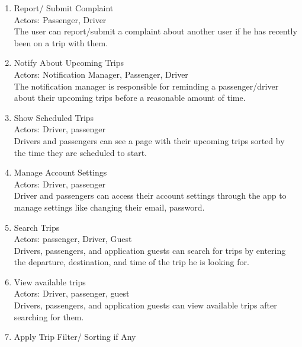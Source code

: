 \documentclass[a4paper, 12pt]{report} %
\begin{document}
\begin{enumerate}
                \item Report/ Submit Complaint \\
                    Actors: Passenger, Driver \\
                    The user can report/submit a complaint about another user if he has recently been on a trip with them.
                \item Notify About Upcoming Trips \\
                    Actors: Notification Manager, Passenger, Driver \\
                    The notification manager is responsible for reminding a passenger/driver about their upcoming trips before a reasonable amount of time.
                \item Show Scheduled Trips \\
                    Actors: Driver, passenger \\
                    Drivers and passengers can see a page with their upcoming trips sorted by the time they are scheduled to start. 
                \item Manage Account Settings\\ 
                    Actors: Driver, passenger\\
                    Driver and passengers can access their account settings through the app to manage settings like changing their email, password.
                \item Search Trips \\
                    Actors: passenger, Driver, Guest \\
                    Drivers, passengers, and application guests can search for trips by entering the departure, destination, and time of the trip he is looking for.
                \item View available trips \\
                    Actors: Driver, passenger, guest \\
                    Drivers, passengers, and application guests can view available trips after searching for them.
                \item Apply Trip Filter/ Sorting if Any \\

\end{enumerate}
\end{document}

